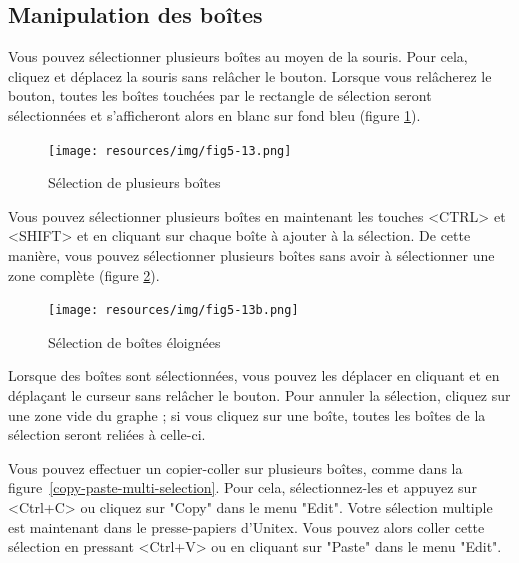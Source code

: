 
\subsection{Manipulation des boîtes}

Vous pouvez sélectionner plusieurs boîtes au moyen de la souris. Pour cela, cliquez et
déplacez la souris sans relâcher le bouton. Lorsque vous relâcherez le bouton, toutes les
boîtes touchées par le rectangle de sélection seront sélectionnées et s’afficheront alors en
blanc sur fond bleu (figure \ref{multi-selection}).

\begin{figure}[!ht]
\begin{center}
\texttt{[image: resources/img/fig5-13.png]}
\caption{Sélection de plusieurs boîtes\label{multi-selection}}
\end{center}
\end{figure}

\bigskip
\noindent Vous pouvez sélectionner plusieurs boîtes en maintenant les touches <CTRL> et <SHIFT> et
en cliquant sur chaque boîte à ajouter à la sélection. De cette manière, vous pouvez sélectionner
plusieurs boîtes sans avoir à sélectionner une zone complète (figure \ref{multi-selection2}).

\begin{figure}[!ht]
\begin{center}
\texttt{[image: resources/img/fig5-13b.png]}
\caption{Sélection de boîtes éloignées\label{multi-selection2}}
\end{center}
\end{figure}

\bigskip
\noindent Lorsque des boîtes sont sélectionnées, vous pouvez les déplacer en cliquant et en déplaçant le curseur sans relâcher le bouton. Pour annuler la sélection, cliquez sur une zone vide
du graphe ; si vous cliquez sur une boîte, toutes les boîtes de la sélection seront reliées à
celle-ci.

\bigskip
{}
\noindent Vous pouvez effectuer un copier-coller sur plusieurs boîtes, comme dans la
figure~\ref{copy-paste-multi-selection}. Pour cela, sélectionnez-les
et appuyez sur <Ctrl+C> ou cliquez sur "Copy" dans le menu "Edit". Votre sélection multiple
est maintenant dans le presse-papiers d’Unitex. Vous pouvez alors coller cette sélection en
pressant <Ctrl+V> ou en cliquant sur "Paste" dans le menu "Edit".

